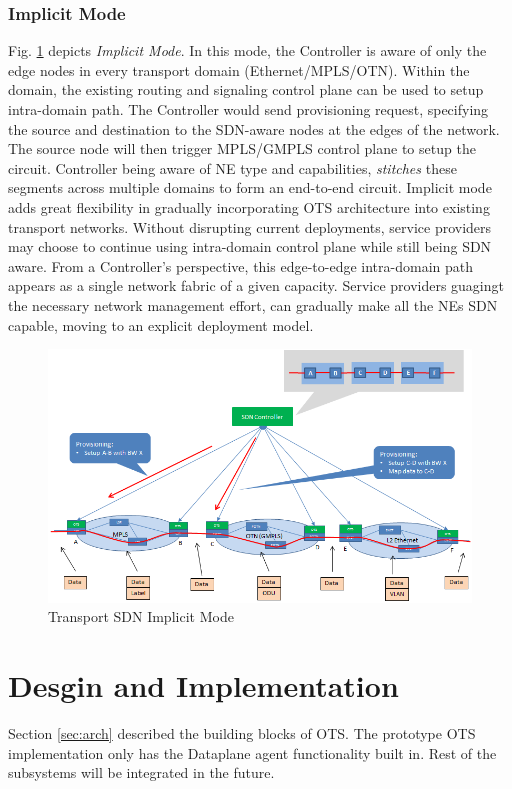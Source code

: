 \documentclass{sig-alternate-10pt}
\begin{document}
	\subsubsection{Implicit Mode} Fig. \ref{fig:OTSImplicit} depicts \textit{Implicit Mode}. In this mode,
	the Controller is aware of only the edge nodes in every transport domain (Ethernet/MPLS/OTN). Within the
	domain, the existing routing and signaling control plane can be used to setup intra-domain path. The
	Controller would send provisioning request, specifying the source and destination to the SDN-aware nodes
	at the edges of the network. The source node will then trigger MPLS/GMPLS control plane to setup the circuit.
	Controller being aware of NE type and capabilities, \textit{stitches} these segments across multiple
	domains to form an end-to-end circuit. Implicit mode adds great flexibility in gradually incorporating
	OTS architecture into existing transport networks. Without disrupting current deployments, service
	providers may choose to continue using intra-domain control plane while still being SDN aware. From a
	Controller's perspective, this edge-to-edge intra-domain path appears as a single network fabric of a
	given capacity. Service providers guagingt the necessary network management effort, can gradually make
	all the NEs SDN capable, moving to an explicit deployment model.

	\begin{figure}[htb]
	\centering
	\includegraphics[scale=0.37]{OTSImplicit.png}
	\caption{Transport SDN Implicit Mode}
	\label{fig:OTSImplicit}
	\end{figure}

\section{Desgin and Implementation}
\label{sec:design}
	Section \ref{sec:arch} described the building blocks of OTS. The prototype OTS implementation only has the 
	Dataplane agent functionality built in. Rest of the subsystems will be integrated in the future. 
\end{document}
